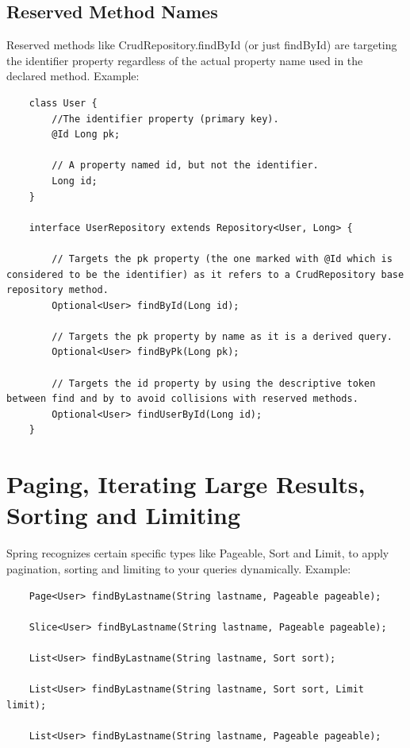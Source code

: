 \documentclass{scrartcl}
\begin{document}
\subsection{Reserved Method Names}

    Reserved methods like CrudRepository.findById (or just findById) are targeting the identifier property regardless of the actual property name used in the declared method.
    Example:

\begin{lstlisting}
    class User {
        //The identifier property (primary key).
        @Id Long pk;

        // A property named id, but not the identifier.
        Long id;
    }

    interface UserRepository extends Repository<User, Long> {

        // Targets the pk property (the one marked with @Id which is considered to be the identifier) as it refers to a CrudRepository base repository method.
        Optional<User> findById(Long id);

        // Targets the pk property by name as it is a derived query.
        Optional<User> findByPk(Long pk);

        // Targets the id property by using the descriptive token between find and by to avoid collisions with reserved methods.
        Optional<User> findUserById(Long id);
    }

\end{lstlisting}

\section{Paging, Iterating Large Results, Sorting and Limiting}

    Spring recognizes certain specific types like Pageable, Sort and Limit, to apply pagination, sorting and limiting to your queries dynamically.
    Example:

\begin{lstlisting}
    Page<User> findByLastname(String lastname, Pageable pageable);

    Slice<User> findByLastname(String lastname, Pageable pageable);

    List<User> findByLastname(String lastname, Sort sort);

    List<User> findByLastname(String lastname, Sort sort, Limit limit);

    List<User> findByLastname(String lastname, Pageable pageable);
\end{lstlisting}
\end{document}
